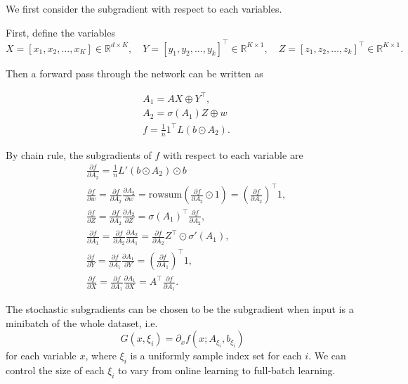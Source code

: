 \documentclass{article}
\numberwithin{equation}{section}
\numberwithin{figure}{section}
\begin{document}
We first consider the subgradient with respect to each variables. 

First, define the variables
\begin{equation}
X = [x_1, x_2, \hdots, x_K] \in\mathbb{R}^{d\times K}, \quad Y = [y_1, y_2, \hdots, y_k]^\top \in\mathbb{R}^{K\times 1}, \quad Z = [z_1, z_2, \hdots, z_k]^\top \in\mathbb{R}^{K\times 1}.
\end{equation}

Then a forward pass through the network can be written as

\begin{equation}
\begin{aligned}
&A_1 = AX\oplus Y^\top, \\
&A_2 = \sigma(A_1)Z \oplus w \\
&f = \frac{1}{n}1^\top L(b\odot A_2).
\end{aligned}
\end{equation}

By chain rule, the subgradients of $f$ with respect to each variable are
\begin{equation}
\begin{aligned}
&\frac{\partial f}{\partial A_2} = \frac{1}{n}L'(b\odot A_2)\odot b \\
&\frac{\partial f}{\partial w} = \frac{\partial f}{\partial A_2}\frac{\partial A_2}{\partial w} = \text{rowsum}(\frac{\partial f}{\partial A_2}\odot 1) = \left(\frac{\partial f}{\partial A_2}\right)^\top 1, \\
&\frac{\partial f}{\partial Z} = \frac{\partial f}{\partial A_2}\frac{\partial A_2}{\partial Z} = \sigma(A_1)^\top \frac{\partial f}{\partial A_2}, \\
&\frac{\partial f}{\partial A_1} = \frac{\partial f}{\partial A_2}\frac{\partial A_2}{\partial A_1} = \frac{\partial f}{\partial A_2}Z^\top \odot \sigma'(A_1), \\
&\frac{\partial f}{\partial Y} = \frac{\partial f}{\partial A_1}\frac{\partial A_1}{\partial Y} = \left(\frac{\partial f}{\partial A_1}\right)^\top 1, \\
&\frac{\partial f}{\partial X} = \frac{\partial f}{\partial A_1}\frac{\partial A_1}{\partial X} = A^\top \frac{\partial f}{\partial A_1}.
\end{aligned}
\end{equation}

The stochastic subgradients can be chosen to be the subgradient when input is a minibatch of the whole dataset, i.e.
\begin{equation}
G(x, \xi_i) = \partial_x f(x; A_{\xi_i}, b_{\xi_i})
\end{equation}
for each variable $x$, where $\xi_i $ is a uniformly sample index set for each $i$. We can control the size of each $\xi_i $ to vary from online learning to full-batch learning.
\end{document}
